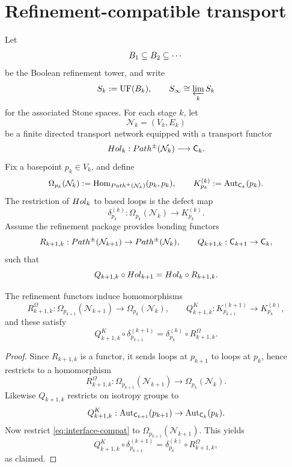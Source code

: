 \section{Refinement-compatible transport}
\label{sec:interface-refinement}
Let
\[
	B_1\subseteq B_2\subseteq \cdots
\]
be the Boolean refinement tower, and write
\[
	S_k:=\operatorname{UF}(B_k),
	\qquad
	S_\infty \cong \varprojlim_k S_k
\]
for the associated Stone spaces.
For each stage \(k\), let
\[
	\mathcal N_k=(V_k,E_k)
\]
be a finite directed transport network equipped with a transport functor
\[
	Hol_k:Path^\pm(\mathcal N_k)\longrightarrow \mathsf C_k.
\]
Fix a basepoint \(p_k\in V_k\), and define
\[
	\Omega_{p_k}(\mathcal N_k)
	:=
	\operatorname{Hom}_{Path^\pm(\mathcal N_k)}(p_k,p_k),
	\qquad
	K_{p_k}^{(k)}
	:=
	\operatorname{Aut}_{\mathsf C_k}(p_k).
\]
The restriction of \(Hol_k\) to based loops is the defect map
\[
	\delta_{p_k}^{(k)}:
	\Omega_{p_k}(\mathcal N_k)\longrightarrow K_{p_k}^{(k)}.
\]
Assume the refinement package provides bonding functors
\[
	R_{k+1,k}:Path^\pm(\mathcal N_{k+1})\to Path^\pm(\mathcal N_k),
	\qquad
	Q_{k+1,k}:\mathsf C_{k+1}\to \mathsf C_k,
\]
such that
\begin{equation}\label{eq:interface-compat}
	Q_{k+1,k}\circ Hol_{k+1}
	=
	Hol_k\circ R_{k+1,k}.
\end{equation}
\begin{lemma}
	\label{lem:interface-bonding}
	The refinement functors induce homomorphisms
	\[
		R_{k+1,k}^{\Omega}:
		\Omega_{p_{k+1}}(\mathcal N_{k+1})\longrightarrow
		\Omega_{p_k}(\mathcal N_k),
		\qquad
		Q_{k+1,k}^{K}:
		K_{p_{k+1}}^{(k+1)}\longrightarrow
		K_{p_k}^{(k)},
	\]
	and these satisfy
	\[
		Q_{k+1,k}^{K}\circ \delta_{p_{k+1}}^{(k+1)}
		=
		\delta_{p_k}^{(k)}\circ R_{k+1,k}^{\Omega}.
	\]
\end{lemma}
\begin{proof}
	Since \(R_{k+1,k}\) is a functor, it sends loops at \(p_{k+1}\) to loops
	at \(p_k\), hence restricts to a homomorphism
	\[
		R_{k+1,k}^{\Omega}:
		\Omega_{p_{k+1}}(\mathcal N_{k+1})\to \Omega_{p_k}(\mathcal N_k).
	\]
	Likewise \(Q_{k+1,k}\) restricts on isotropy groups to
	\[
		Q_{k+1,k}^{K}:
		\operatorname{Aut}_{\mathsf C_{k+1}}(p_{k+1})\to \operatorname{Aut}_{\mathsf C_k}(p_k).
	\]
	Now restrict \cref{eq:interface-compat} to
	\(\Omega_{p_{k+1}}(\mathcal N_{k+1})\). This yields
	\[
		Q_{k+1,k}^{K}\circ \delta_{p_{k+1}}^{(k+1)}
		=
		\delta_{p_k}^{(k)}\circ R_{k+1,k}^{\Omega},
	\]
	as claimed.
\end{proof}
